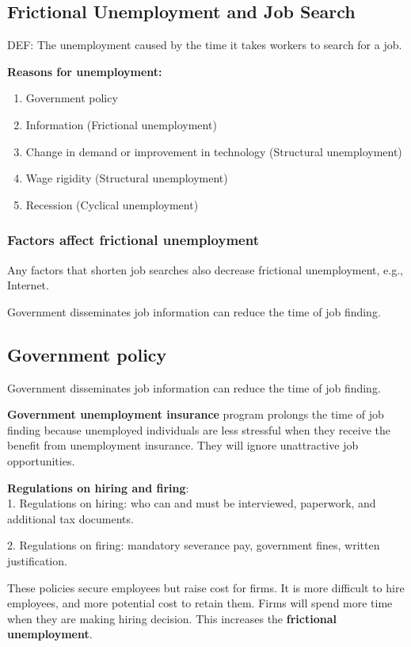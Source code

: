 \documentclass[12pt]{article}
\begin{document}
\subsection{Frictional Unemployment and Job Search}

DEF: The unemployment caused by the time it takes workers to search for a job.


{\textbf {Reasons for unemployment:}}
\begin{enumerate}
\item Government policy
\item Information (Frictional unemployment)
\item Change in demand or improvement in technology (Structural unemployment)
\item Wage rigidity (Structural unemployment)
\item Recession (Cyclical unemployment)
\end{enumerate}


\subsubsection{Factors affect frictional unemployment}
Any factors that shorten job searches also decrease frictional unemployment, e.g., 
Internet.


Government disseminates job information can reduce the time of job finding.


\subsection{Government policy}
Government disseminates job information can reduce the time of job finding.

{\textbf {Government unemployment insurance}} program prolongs the time of job finding 
because unemployed individuals are less stressful when they receive the benefit from 
unemployment insurance. They will ignore unattractive job opportunities.

{\textbf {Regulations on hiring and firing}}:\\
1. Regulations on hiring: who can and must be interviewed, paperwork, and additional
tax documents.

2. Regulations on firing: mandatory severance pay, government fines, written
justification.

These policies secure employees but raise cost for firms. It is more difficult to 
hire employees, and more potential cost to retain them. Firms will spend more time
when they are making hiring decision. This increases the {\textbf {frictional 
unemployment}}.
\end{document}
